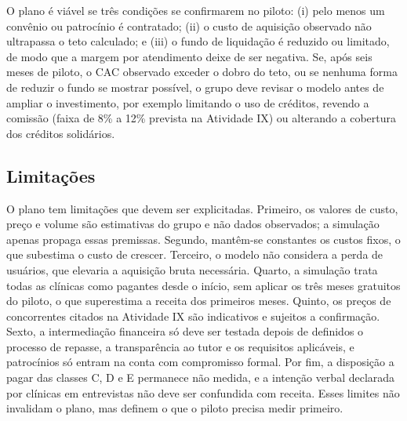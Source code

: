 O plano é viável se três condições se confirmarem no piloto: (i) pelo menos um convênio ou patrocínio é contratado; (ii) o custo de aquisição observado não ultrapassa o teto calculado; e (iii) o fundo de liquidação é reduzido ou limitado, de modo que a margem por atendimento deixe de ser negativa. Se, após seis meses de piloto, o CAC observado exceder o dobro do teto, ou se nenhuma forma de reduzir o fundo se mostrar possível, o grupo deve revisar o modelo antes de ampliar o investimento, por exemplo limitando o uso de créditos, revendo a comissão (faixa de 8\% a 12\% prevista na Atividade IX) ou alterando a cobertura dos créditos solidários.

\subsection{Limitações}

O plano tem limitações que devem ser explicitadas. Primeiro, os valores de custo, preço e volume são estimativas do grupo e não dados observados; a simulação apenas propaga essas premissas. Segundo, mantêm-se constantes os custos fixos, o que subestima o custo de crescer. Terceiro, o modelo não considera a perda de usuários, que elevaria a aquisição bruta necessária. Quarto, a simulação trata todas as clínicas como pagantes desde o início, sem aplicar os três meses gratuitos do piloto, o que superestima a receita dos primeiros meses. Quinto, os preços de concorrentes citados na Atividade IX são indicativos e sujeitos a confirmação. Sexto, a intermediação financeira só deve ser testada depois de definidos o processo de repasse, a transparência ao tutor e os requisitos aplicáveis, e patrocínios só entram na conta com compromisso formal. Por fim, a disposição a pagar das classes C, D e E permanece não medida, e a intenção verbal declarada por clínicas em entrevistas não deve ser confundida com receita. Esses limites não invalidam o plano, mas definem o que o piloto precisa medir primeiro.
